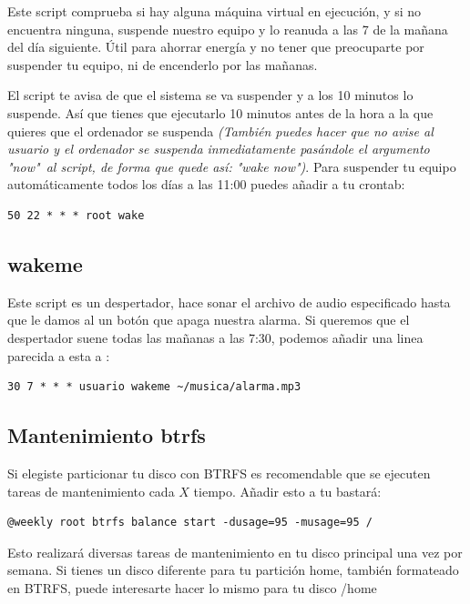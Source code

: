 \documentclass[11pt]{article}
\begin{document}
Este script comprueba si hay alguna máquina virtual en ejecución, y si no encuentra ninguna, suspende nuestro equipo y lo reanuda a las 7 de la mañana del día siguiente. Útil para ahorrar energía y no tener que preocuparte por suspender tu equipo, ni de encenderlo por las mañanas.

\vspace{5pt}

El script te avisa de que el sistema se va suspender y a los 10 minutos lo suspende. Así que tienes que ejecutarlo 10 minutos antes de la hora a la que quieres que el ordenador se suspenda \textit{(También puedes hacer que no avise al usuario y el ordenador se suspenda inmediatamente pasándole el argumento "now"\ al script, de forma que quede así: "wake now")}. Para suspender tu equipo automáticamente todos los días a las 11:00 puedes añadir a tu crontab:

\begin{verbatim}
50 22 * * * root wake
\end{verbatim}

\subsection{wakeme}

Este script es un despertador, hace sonar el archivo de audio especificado hasta que le damos al un botón que apaga nuestra alarma. Si queremos que el despertador suene todas las mañanas a las 7:30, podemos añadir una linea parecida a esta a :

\begin{verbatim}
30 7 * * * usuario wakeme ~/musica/alarma.mp3
\end{verbatim}

\subsection{Mantenimiento btrfs}

Si elegiste particionar tu disco con BTRFS es recomendable que se ejecuten tareas de mantenimiento cada $X$ tiempo. Añadir esto a tu  bastará:

\begin{verbatim}
@weekly root btrfs balance start -dusage=95 -musage=95 /
\end{verbatim}

Esto realizará diversas tareas de mantenimiento en tu disco principal una vez por semana. Si tienes un disco diferente para tu partición home, también formateado en BTRFS, puede interesarte hacer lo mismo para tu disco /home
\end{document}
